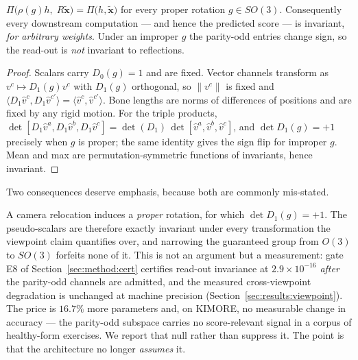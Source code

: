 \begin{proposition}
\label{prop:invariance}
$\Pi\big(\rho(g)h,\;R\tilde{\bm{x}}\big)=\Pi\big(h,\tilde{\bm{x}}\big)$ for every proper rotation
$g\in SO(3)$. Consequently every downstream computation --- and hence the predicted score --- is
invariant, \emph{for arbitrary weights}. Under an improper $g$ the parity-odd entries change sign, so
the read-out is \emph{not} invariant to reflections.
\end{proposition}
\begin{proof}
Scalars carry $D_0(g)=1$ and are fixed. Vector channels transform as $v^c\mapsto D_1(g)v^c$ with
$D_1(g)$ orthogonal, so $\|v^c\|$ is fixed and
$\langle D_1 \hat v^{c}, D_1 \hat v^{c'}\rangle=\langle \hat v^{c},\hat v^{c'}\rangle$. Bone lengths
are norms of differences of positions and are fixed by any rigid motion. For the triple products,
$\det[D_1\hat v^{a},D_1\hat v^{b},D_1\hat v^{c}]=\det(D_1)\,\det[\hat v^{a},\hat v^{b},\hat v^{c}]$,
and $\det D_1(g)=+1$ precisely when $g$ is proper; the same identity gives the sign flip for improper
$g$. Mean and max are permutation-symmetric functions of invariants, hence invariant.
\end{proof}

Two consequences deserve emphasis, because both are commonly mis-stated.

\begin{remark}
\label{rem:parity}
A camera relocation induces a \emph{proper} rotation, for which $\det D_1(g)=+1$. The pseudo-scalars
are therefore exactly invariant under every transformation the viewpoint claim quantifies over, and
narrowing the guaranteed group from $O(3)$ to $SO(3)$ forfeits none of it. This is not an argument but
a measurement: gate E8 of Section~\ref{sec:method:cert} certifies read-out invariance at
$2.9\times10^{-16}$ \emph{after} the parity-odd channels are admitted, and the measured cross-viewpoint
degradation is unchanged at machine precision (Section~\ref{sec:results:viewpoint}). The price is
$16.7\%$ more parameters and, on KIMORE, no measurable change in accuracy --- the parity-odd subspace
carries no score-relevant signal in a corpus of healthy-form exercises. We report that null rather than
suppress it. The point is that the architecture no longer \emph{assumes} it.
\end{remark}

